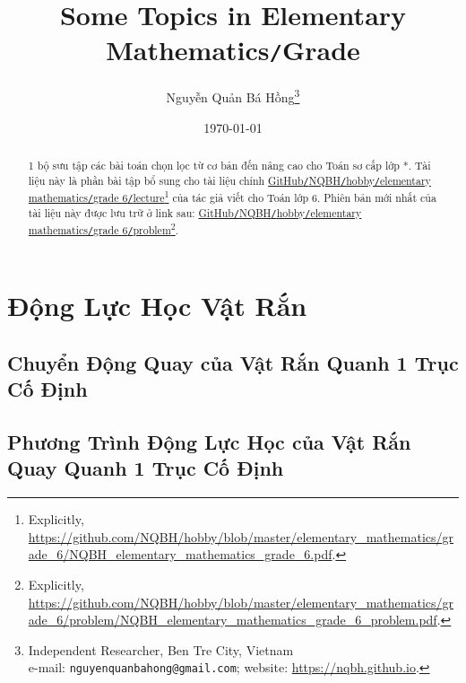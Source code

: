 \documentclass{article}
\title{Some Topics in Elementary Mathematics\texttt{/}Grade }
\author{Nguyễn Quản Bá Hồng\footnote{Independent Researcher, Ben Tre City, Vietnam\\e-mail: \texttt{nguyenquanbahong@gmail.com}; website: \url{https://nqbh.github.io}.}}
\date{\today}
\numberwithin{equation}{section}
\begin{document}
\maketitle
\begin{abstract}
	1 bộ sưu tập các bài toán chọn lọc từ cơ bản đến nâng cao cho Toán sơ cấp lớp *. Tài liệu này là phần bài tập bổ sung cho tài liệu chính \href{https://github.com/NQBH/hobby/blob/master/elementary_mathematics/grade_6/NQBH_elementary_mathematics_grade_6.pdf}{GitHub\texttt{/}NQBH\texttt{/}hobby\texttt{/}elementary mathematics\texttt{/}grade 6\texttt{/}lecture}\footnote{Explicitly, \url{https://github.com/NQBH/hobby/blob/master/elementary_mathematics/grade_6/NQBH_elementary_mathematics_grade_6.pdf}.} của tác giả viết cho Toán lớp 6. Phiên bản mới nhất của tài liệu này được lưu trữ ở link sau: \href{https://github.com/NQBH/hobby/blob/master/elementary_mathematics/grade_6/problem/NQBH_elementary_mathematics_grade_6_problem.pdf}{GitHub\texttt{/}NQBH\texttt{/}hobby\texttt{/}elementary mathematics\texttt{/}grade 6\texttt{/}problem}\footnote{Explicitly, \url{https://github.com/NQBH/hobby/blob/master/elementary_mathematics/grade_6/problem/NQBH_elementary_mathematics_grade_6_problem.pdf}.}.
\end{abstract}
\tableofcontents
\newpage



\section{Động Lực Học Vật Rắn}

\subsection{Chuyển Động Quay của Vật Rắn Quanh 1 Trục Cố Định}


\subsection{Phương Trình Động Lực Học của Vật Rắn Quay Quanh 1 Trục Cố Định}

\end{document}
